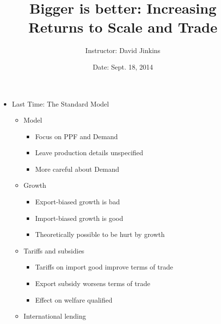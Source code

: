\documentclass[ignorenonframetext,]{beamer}
\title{Bigger is better: Increasing Returns to Scale and Trade}
\author{Instructor: David Jinkins}
\date{Date: Sept. 18, 2014}
\begin{document}
\frame{\titlepage}

\begin{frame}
\begin{itemize}
\itemsep1pt\parskip0pt
\item
  Last Time: The Standard Model 
  \begin{itemize}
        \item Model
        \begin{itemize}
            \item Focus on PPF and Demand
            \item Leave production details unspecified
            \item More careful about Demand
        \end{itemize}
        \item Growth
        \begin{itemize}
            \item Export-biased growth is bad
            \item Import-biased growth is good
            \item Theoretically possible to be hurt by growth
        \end{itemize}
        \item Tariffs and subsidies
        \begin{itemize}
            \item Tariffs on import good improve terms of trade
            \item Export subsidy worsens terms of trade
            \item Effect on welfare qualified
        \end{itemize}
        \item International lending
    \end{itemize}
\end{itemize}

\end{frame}
\end{document}
